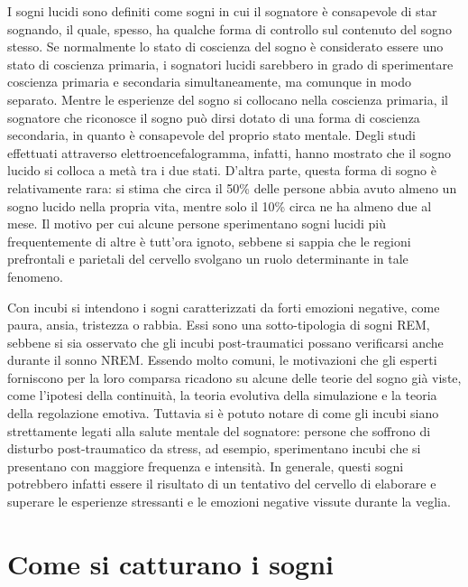 
I sogni lucidi sono definiti come sogni in cui il sognatore è consapevole di star sognando, il quale, spesso, ha
qualche forma di controllo sul contenuto del sogno stesso.
Se normalmente lo stato di coscienza del sogno è considerato essere uno stato di coscienza primaria,
i sognatori lucidi sarebbero in grado di sperimentare coscienza primaria e secondaria simultaneamente, ma comunque
in modo separato.
Mentre le esperienze del sogno si collocano nella coscienza primaria, il sognatore che
riconosce il sogno può dirsi dotato di una forma di coscienza secondaria, in quanto è consapevole del proprio
stato mentale.
Degli studi effettuati attraverso elettroencefalogramma, infatti, hanno mostrato che il sogno lucido si colloca a metà
tra i due stati. %
D'altra parte, questa forma di sogno è relativamente rara: si stima che circa il 50\% delle persone abbia avuto almeno
un sogno lucido nella propria vita, mentre solo il 10\% circa ne ha almeno due al mese.
Il motivo per cui alcune persone sperimentano sogni lucidi più frequentemente di altre è tutt'ora ignoto, sebbene
si sappia che le regioni prefrontali e parietali del cervello svolgano un ruolo determinante in tale fenomeno.


Con incubi si intendono i sogni caratterizzati da forti emozioni negative, come paura, ansia, tristezza o rabbia.
Essi sono una sotto-tipologia di sogni REM, sebbene si sia osservato che gli incubi post-traumatici possano
verificarsi anche durante il sonno NREM\@.
Essendo molto comuni, le motivazioni che gli esperti forniscono per la loro comparsa ricadono su alcune delle
teorie del sogno già viste, come l'ipotesi della continuità, la teoria evolutiva della simulazione e
la teoria della regolazione emotiva.
Tuttavia si è potuto notare di come gli incubi siano strettamente legati alla salute mentale del sognatore: persone
che soffrono di disturbo post-traumatico da stress, ad esempio, sperimentano incubi che si presentano con
maggiore frequenza e intensità.
In generale, questi sogni potrebbero infatti essere il risultato di un tentativo del cervello di elaborare e superare
le esperienze stressanti e le emozioni negative vissute durante la veglia.

\section{Come si catturano i sogni}

